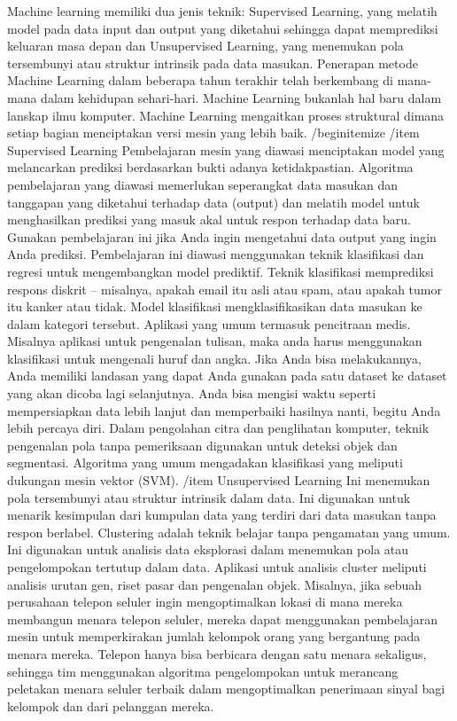 Machine learning memiliki dua jenis teknik: Supervised Learning, yang melatih model pada data input dan output yang diketahui sehingga dapat memprediksi keluaran masa depan dan Unsupervised Learning, yang menemukan pola tersembunyi atau struktur intrinsik pada data masukan.
Penerapan metode Machine Learning dalam beberapa tahun terakhir telah berkembang di mana-mana dalam kehidupan sehari-hari. Machine Learning bukanlah hal baru dalam lanskap ilmu komputer. Machine Learning mengaitkan proses struktural dimana setiap bagian menciptakan versi mesin yang lebih baik.
/begin{itemize}
/item Supervised Learning
Pembelajaran mesin yang diawasi menciptakan model yang melancarkan prediksi berdasarkan bukti adanya ketidakpastian. Algoritma pembelajaran yang diawasi memerlukan seperangkat data masukan dan tanggapan yang diketahui terhadap data (output) dan melatih model untuk menghasilkan prediksi yang masuk akal untuk respon terhadap data baru. Gunakan pembelajaran ini jika Anda ingin mengetahui data output yang ingin Anda prediksi. Pembelajaran ini diawasi menggunakan teknik klasifikasi dan regresi untuk mengembangkan model prediktif.
Teknik klasifikasi memprediksi respons diskrit – misalnya, apakah email itu asli atau spam, atau apakah tumor itu kanker atau tidak. Model klasifikasi mengklasifikasikan data masukan ke dalam kategori tersebut. Aplikasi yang umum termasuk pencitraan medis. Misalnya aplikasi untuk pengenalan tulisan, maka anda harus menggunakan klasifikasi untuk mengenali huruf dan angka.
Jika Anda bisa melakukannya, Anda memiliki landasan yang dapat Anda gunakan pada satu dataset ke dataset yang akan dicoba lagi selanjutnya. Anda bisa mengisi waktu seperti mempersiapkan data lebih lanjut dan memperbaiki hasilnya nanti, begitu Anda lebih percaya diri. Dalam pengolahan citra dan penglihatan komputer, teknik pengenalan pola tanpa pemeriksaan digunakan untuk deteksi objek dan segmentasi. Algoritma yang umum mengadakan klasifikasi yang meliputi dukungan mesin vektor (SVM).
/item Unsupervised Learning
Ini menemukan pola tersembunyi atau struktur intrinsik dalam data. Ini digunakan untuk menarik kesimpulan dari kumpulan data yang terdiri dari data masukan tanpa respon berlabel. Clustering adalah teknik belajar tanpa pengamatan yang umum. Ini digunakan untuk analisis data eksplorasi dalam menemukan pola atau pengelompokan tertutup dalam data. Aplikasi untuk analisis cluster meliputi analisis urutan gen, riset pasar dan pengenalan objek.
Misalnya, jika sebuah perusahaan telepon seluler ingin mengoptimalkan lokasi di mana mereka membangun menara telepon seluler, mereka dapat menggunakan pembelajaran mesin untuk memperkirakan jumlah kelompok orang yang bergantung pada menara mereka. Telepon hanya bisa berbicara dengan satu menara sekaligus, sehingga tim menggunakan algoritma pengelompokan untuk merancang peletakan menara seluler terbaik dalam mengoptimalkan penerimaan sinyal bagi kelompok dan dari pelanggan mereka.
